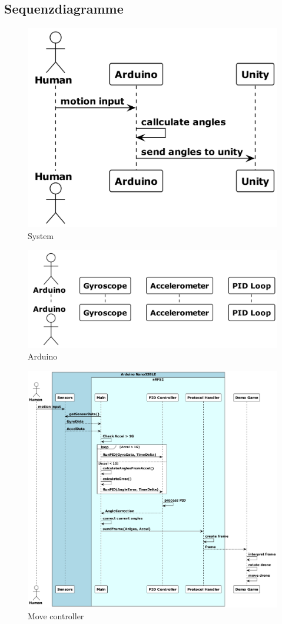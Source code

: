 \subsection{Sequenzdiagramme}
\begin{figure}[H]
  \begin{center}
    \includegraphics[width=0.7\linewidth]{content/diagrams/out/sequence/system.png}
    \caption{System}
  \end{center}
\end{figure}

\begin{figure}[H]
  \begin{center}
    \includegraphics[width=0.8\linewidth]{content/diagrams/out/sequence/arduino.png}
    \caption{Arduino}
  \end{center}
\end{figure}

\begin{figure}[H]
  \begin{center}
    \includegraphics[width=0.8\textheight]{content/diagrams/out/sequence/moveController.png}
    \caption{Move controller}
  \end{center}
\end{figure}

